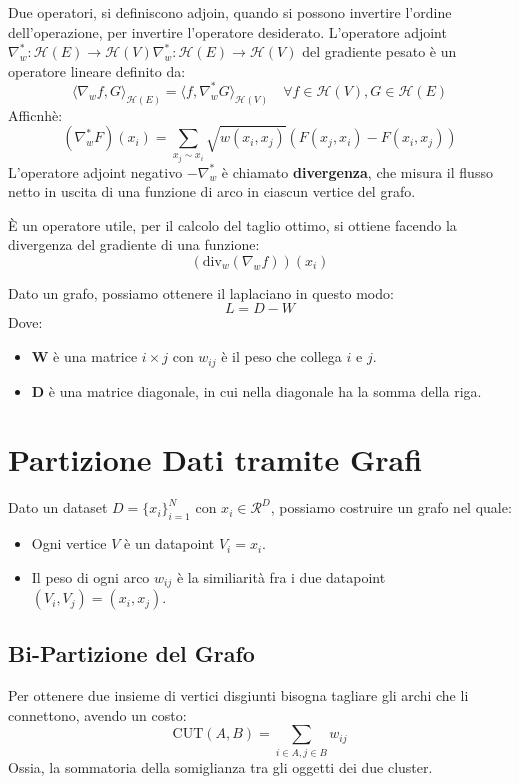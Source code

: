 \begin{defn}[Adjoint]
  Due operatori, si definiscono adjoin, quando si possono invertire l’ordine dell’operazione, per invertire l’operatore desiderato.
  L'operatore adjoint $\nabla_w^* : \mathcal{H}(E) \rightarrow \mathcal{H}(V)\nabla_w^* : \mathcal{H}(E) \rightarrow \mathcal{H}(V)$ del gradiente pesato è un operatore lineare definito da:
  \[
    \langle \nabla_w f, G \rangle_{\mathcal{H}(E)} = \langle f, \nabla_w^* G \rangle_{\mathcal{H}(V)} \quad \forall f \in \mathcal{H}(V), G \in \mathcal{H}(E)
  \]
  Afficnhè:
  \[
    (\nabla_w^* F)(x_i) = \sum_{x_j \sim x_i} \sqrt{w(x_i, x_j)}(F(x_j, x_i) - F(x_i, x_j))
  \]
  L'operatore adjoint negativo $-\nabla_w^*$ è chiamato \textbf{divergenza}, che misura il flusso netto in uscita di una funzione di arco in ciascun vertice del grafo.
\end{defn}

\begin{defn}[Laplaciano]
  È un operatore utile, per il calcolo del taglio ottimo, si ottiene facendo la divergenza del gradiente di una funzione:
  \[
    (\text{div}_w(\nabla_w f))(x_i)
  \]
\end{defn}
\newpage
Dato un grafo, possiamo ottenere il laplaciano in questo modo:
\[
 L = D - W
\]
Dove:
\begin{itemize}
  \item \textbf{W} è una matrice $i \times j$ con $w_{ij}$ è il peso che collega $i$ e $j$.
  \item \textbf{D} è una matrice diagonale, in cui nella diagonale ha la somma della riga.
\end{itemize}

\section{Partizione Dati tramite Grafi}
Dato un dataset $D = \{x_i\}^N_{i = 1}$ con $x_i \in \mathcal{R}^D$, possiamo costruire un grafo nel quale:
\begin{itemize}
  \item Ogni vertice $V$ è un datapoint $V_i = x_i$.
  \item Il peso di ogni arco $w_{ij}$ è la similiarità fra i due datapoint $(V_i, V_j) = (x_i, x_j)$.
\end{itemize}

\subsection{Bi-Partizione del Grafo}
Per ottenere due insieme di vertici disgiunti bisogna tagliare gli archi che li connettono, avendo un costo:
\[
  \text{CUT}(A, B) = \sum_{i \in A, j \in B}{w_{ij}}
\]
Ossia, la sommatoria della somiglianza tra gli oggetti dei due cluster.

